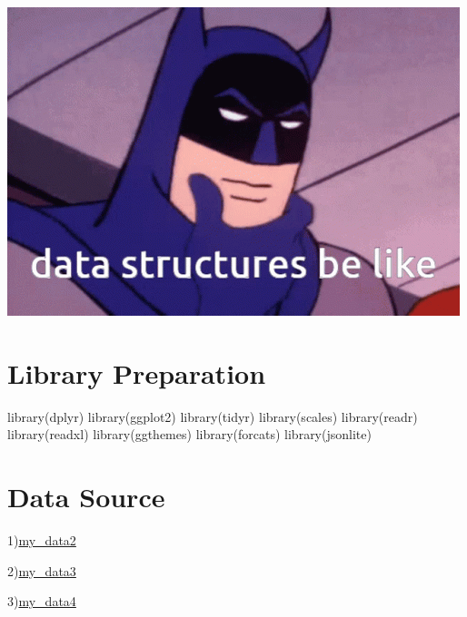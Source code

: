 \documentclass[
  11pt,
  a4paper,
  DIV=11,
  numbers=noendperiod]{scrartcl}
\author{}
\date{}
\newenvironment{Shaded}{\begin{snugshade}}{\end{snugshade}}
\newcommand{\FunctionTok}[1]{\textcolor[rgb]{0.28,0.35,0.67}{#1}}
\newcommand{\NormalTok}[1]{\textcolor[rgb]{0.00,0.23,0.31}{#1}}
\begin{document}
\begin{center}
\includegraphics{docs/batman-thinking.gif}
\end{center}

\section{Library Preparation}\label{library-preparation}

\begin{Shaded}
\begin{Highlighting}[]
\FunctionTok{library}\NormalTok{(dplyr)}
\FunctionTok{library}\NormalTok{(ggplot2)}
\FunctionTok{library}\NormalTok{(tidyr)}
\FunctionTok{library}\NormalTok{(scales)}
\FunctionTok{library}\NormalTok{(readr)}
\FunctionTok{library}\NormalTok{(readxl)}
\FunctionTok{library}\NormalTok{(ggthemes)}
\FunctionTok{library}\NormalTok{(forcats)}
\FunctionTok{library}\NormalTok{(jsonlite)}
\end{Highlighting}
\end{Shaded}

\section{Data Source}\label{data-source}

1)\href{https://www.kaggle.com/datasets/fathyfathysahlool/electric-vehicles-cars-2011-2024}{my\_data2}

2)\href{https://ourworldindata.org/grapher/co2-emissions-transport?time=latest}{my\_data3}

3)\href{https://data.tuik.gov.tr/Bulten/Index?p=Motorlu-Kara-Tasitlari-Ekim-2024-53461}{my\_data4}
\end{document}
